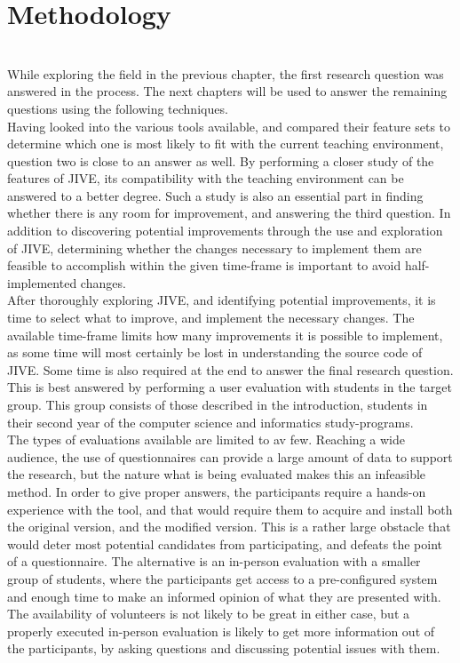\chapter{Methodology}\label{methodology}
~\\
While exploring the field in the previous chapter, the first research question was answered in the process.
The next chapters will be used to answer the remaining questions using the following techniques.
~\\

Having looked into the various tools available, and compared their feature sets to determine which one is most likely to fit with the current teaching environment, question two is close to an answer as well.
By performing a closer study of the features of JIVE, its compatibility with the teaching environment can be answered to a better degree.
Such a study is also an essential part in finding whether there is any room for improvement, and answering the third question.
In addition to discovering potential improvements through the use and exploration of JIVE, determining whether the changes necessary to implement them are feasible to accomplish within the given time-frame is important to avoid half-implemented changes.
~\\

After thoroughly exploring JIVE, and identifying potential improvements, it is time to select what to improve, and implement the necessary changes.
The available time-frame limits how many improvements it is possible to implement, as some time will most certainly be lost in understanding the source code of JIVE.
Some time is also required at the end to answer the final research question.
This is best answered by performing a user evaluation with students in the target group.
This group consists of those described in the introduction, students in their second year of the computer science and informatics study-programs.
~\\

The types of evaluations available are limited to av few.
Reaching a wide audience, the use of questionnaires can provide a large amount of data to support the research, but the nature what is being evaluated makes this an infeasible method.
In order to give proper answers, the participants require a hands-on experience with the tool, and that would require them to acquire and install both the original version, and the modified version.
This is a rather large obstacle that would deter most potential candidates from participating, and defeats the point of a questionnaire.
The alternative is an in-person evaluation with a smaller group of students, where the participants get access to a pre-configured system and enough time to make an informed opinion of what they are presented with.
The availability of volunteers is not likely to be great in either case, but a properly executed in-person evaluation is likely to get more information out of the participants, by asking questions and discussing potential issues with them.


